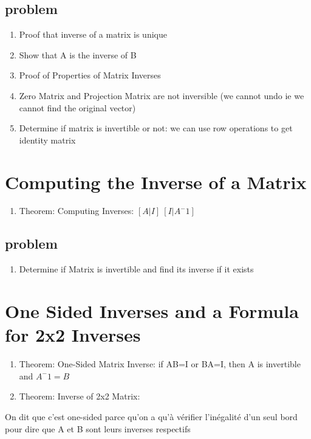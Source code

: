 \documentclass{article}
\begin{document}
\subsection{problem}
\begin{enumerate}
    \item Proof that inverse of a matrix is unique
    \item Show that A is the inverse of B
    \item Proof of Properties of Matrix Inverses
    \item Zero Matrix and Projection Matrix are not inversible (we cannot
	undo ie we cannot find the original vector)
    \item Determine if matrix is invertible or not: we can use row
	operations to get identity matrix
\end{enumerate}

\section{Computing the Inverse of a Matrix}

\begin{enumerate}
    \item Theorem: Computing Inverses: $[A|I] ~ [I|A^-1] $
\end{enumerate}

\subsection{problem}
\begin{enumerate}
    \item Determine if Matrix is invertible and find its inverse if it
	exists
\end{enumerate}

\section{One Sided Inverses and a Formula for 2x2 Inverses}

\begin{enumerate}
    \item Theorem: One-Sided Matrix Inverse: if AB=I or BA=I, then A
	is invertible and $A^-1 = B$
    \item Theorem: Inverse of 2x2 Matrix:
\end{enumerate}

\begin{intuition}
    On dit que c'est one-sided parce qu'on a qu'à vérifier l'inégalité
    d'un seul bord pour dire que A et B sont leurs inverses respectifs
\end{intuition}
\end{document}
